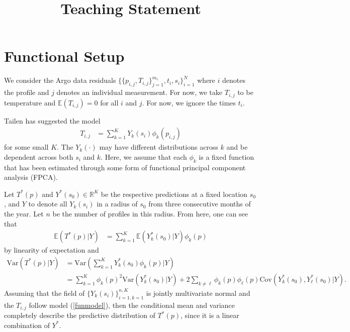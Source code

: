 \documentclass[11pt]{article}
\title{Teaching Statement}
\author{}
\newcommand{\Var}{\textrm{Var}}
\newcommand{\Cov}{\textrm{Cov}}
\begin{document}

\section{Functional Setup}

We consider the Argo data residuals $\{ \{p_{i,j}, T_{i,j}\}_{j=1}^{m_i}, t_i, s_i\}_{i=1}^N$ where $i$ denotes the profile and $j$ denotes an individual measurement. For now, we take $T_{i,j}$ to be temperature and $\mathbb{E}(T_{i,j}) = 0$ for all $i$ and $j$. For now, we ignore the times $t_i$.

Tailen has suggested the model \begin{align}
T_{i,j} &= \sum_{k=1}^K Y_{k}(s_i) \phi_k(p_{i,j})\label{funmodel}
\end{align}for some small $K$. The $Y_{k}(\cdot)$ may have different distributions across $k$ and be dependent across both $s_i$ and $k$. Here, we assume that each $\phi_k$ is a fixed function that has been estimated through some form of functional principal component analysis (FPCA). 

Let $T^*(p)$ and $Y^*(s_0) \in \mathbb{R}^K$ be the respective predictions at a fixed location $s_0$, and $Y$ to denote all $Y_k(s_i)$ in a radius of $s_0$ from three consecutive months of the year. Let $n$ be the number of profiles in this radius. From here, one can see that \begin{align*}
\mathbb{E}(T^*(p) |  Y) &= \sum_{k=1}^K \mathbb{E}(Y^*_k(s_0) | Y) \phi_k(p) 
\end{align*}
by linearity of expectation and 
\begin{align*}
\Var(T^*(p) |  Y) &=\Var\left( \sum_{k=1}^K Y^*_k(s_0) \phi_k(p) \bigg| Y\right) \\
&= \sum_{k=1}^K \phi_k(p)^2 \Var(Y_k^*(s_0) | Y) + 2\sum_{k\neq \ell} \phi_k(p)\phi_{\ell}(p)\Cov(Y_k^*(s_0),  Y_\ell^*(s_0) | Y).
\end{align*}
Assuming that the field of $\{Y_{k}(s_i)\}_{i=1, k=1}^{n, K}$ is jointly multivariate normal and the $T_{i,j}$ follow model (\ref{funmodel}), then the conditional mean and variance completely describe the predictive distribution of $T^*(p)$, since it is a linear combination of $Y^*$. 
\end{document}
